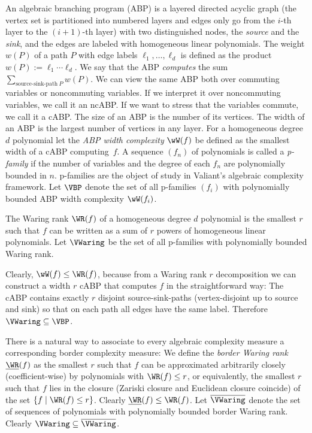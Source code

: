 An algebraic branching program (ABP) is a layered directed acyclic graph (the vertex set is partitioned into numbered layers and edges only go from the $i$-th layer to the $(i+1)$-th layer) with two distinguished nodes, the \emph{source} and the \emph{sink}, and the edges are labeled with homogeneous linear polynomials.
The weight $w(P)$ of a path $P$ with edge labels $\ell_1, \ldots, \ell_d$ is defined as the product $w(P) := \ell_1 \cdots \ell_d.$
We say that the ABP \emph{computes} the sum $\sum_{\text{source-sink-path}\ P} w(P)$.
We can view the same ABP both over commuting variables or noncommuting variables.
If we interpret it over noncommuting variables, we call it an ncABP. If we want to stress that the variables commute, we call it a cABP.
The size of an ABP is the number of its vertices. The width of an ABP is the largest number of vertices in any layer.
For a homogeneous degree $d$ polynomial let the \emph{ABP width complexity} $\wW(f)$ be defined as the smallest width of a cABP computing~$f$. 
A sequence $(f_n)$ of polynomials is called a \emph{p-family} if the number of variables
and the degree of each $f_n$ are polynomially bounded in $n$. p-families are the object of study
in Valiant's algebraic complexity framework.
Let $\VBP$ denote the set of all p-families $(f_i)$ with polynomially bounded ABP width complexity $\wW(f_i)$.

The Waring rank $\WR(f)$ of a homogeneous degree $d$ polynomial is the smallest $r$ such that $f$ can be written as a sum of $r$ powers of homogeneous linear polynomials.
Let $\VWaring$ be the set of all p-families with polynomially bounded Waring rank.

Clearly, $\wW(f) \leq \WR(f)$, because from a Waring rank $r$ decomposition we can construct a width $r$ cABP that computes $f$ in the straightforward way: The cABP contains exactly $r$ disjoint source-sink-paths (vertex-disjoint up to source and sink) so that on each path all edges have the same label. Therefore $\VWaring \subseteq \VBP$.

There is a natural way to associate to every algebraic complexity measure a corresponding border complexity measure:
We define the \emph{border Waring rank} $\underline{\WR}(f)$ as the smallest $r$ such that $f$ can be approximated arbitrarily closely (coefficient-wise) by polynomials with $\WR(f)\leq r$, or equivalently, the smallest $r$ such that $f$ lies in the closure (Zariski closure and Euclidean closure coincide) of the set $\{f \mid \WR(f) \leq r\}$.
Clearly $\underline{\WR}(f)\leq \WR(f)$.
Let $\overline{\VWaring}$ denote the set of sequences of polynomials with polynomially bounded border Waring rank. Clearly $\VWaring \subseteq \overline{\VWaring}$.

